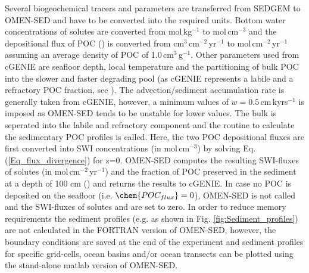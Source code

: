 \documentclass[gmd, manuscript]{copernicus}
\begin{document}
Several biogeochemical tracers and parameters are transferred from SEDGEM to OMEN-SED and have to be converted into the required units. 
Bottom water concentrations of solutes are converted from mol\,kg$^{-1}$ to mol\,cm$^{-3}$ and the depositional flux of POC () is converted from cm$^{3}$\,cm$^{-2}$\,yr$^{-1}$ 
to mol\,cm$^{-2}$\,yr$^{-1}$ assuming an average density of POC of 1.0\,cm$^{3}$\,g$^{-1}$.
Other parameters used from cGENIE are seafloor depth, local temperature and the partitioning of bulk POC into the slower and faster degrading pool 
(as cGENIE represents a labile and a refractory POC fraction, see \citet{ridgwell_marine_2007}). 
The advection/sediment accumulation rate is generally taken from cGENIE, however, a minimum values of $w=0.5$\,cm\,kyrs$^{-1}$ is imposed as OMEN-SED tends to be unstable for lower values. 
The bulk  is seperated into the labile and refractory component and the routine to calculate the sedimentary POC profiles is called. 
Here, the two POC depositional fluxes are first converted into SWI concentrations (in mol\,cm$^{-3}$) by solving Eq. (\ref{Eq_flux_divergence}) for z=0. 
OMEN-SED computes the resulting SWI-fluxes of solutes (in mol\,cm$^{-2}$\,yr$^{-1}$) and the fraction of POC preserved in the sediment at a depth of 100 cm () and returns the 
results to cGENIE. In case no POC is deposited on the seafloor (i.e. $\chem{POC_{flux}}=0$), OMEN-SED is not called and the SWI-fluxes of solutes and  are set to zero.
In order to reduce memory requirements the sediment profiles (e.g. as shown in Fig. \ref{fig:Sediment_profiles}) are not calculated in the FORTRAN version of OMEN-SED, 
however, the boundary conditions are saved at the end of the experiment and sediment profiles for specific grid-cells, ocean basins and/or ocean transects can be plotted 
using the stand-alone matlab version of OMEN-SED. 


\end{document}

